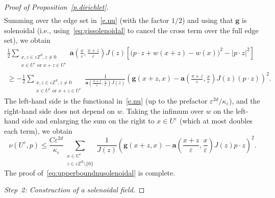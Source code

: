 \documentclass[11pt]{amsart}
\theoremstyle{plain}
\theoremstyle{definition}
\theoremstyle{remark}
\newcommand{\Zd}{\mathbb{Z}^d}
\renewcommand{\a}{\mathbf{a}}
\newcommand{\eps}{\varepsilon}
\begin{document}
\begin{proof}[Proof of Proposition~\ref{p.dirichlet}]
\begin{align*}
		\end{align*}
		Summing over the edge set in~\eqref{e.nu} (with the factor $1/2$) and using that $\mathbf{g}$ is solenoidal (i.e., using~\eqref{eq:gissolenoidal} to cancel the cross term over the full edge set), we obtain
		\begin{multline*}
			\frac{1}{2}\sum_{\substack{x, z \in \eps\Zd, z \ne 0 \\ x \in U^\eps \text{ or } x{+}z \in U^\eps}} \a\left(\frac{x}{\eps}, \frac{x+z}{\eps}\right) J(z) \left[ \bigl(p \cdot z + w(x{+}z) - w(x)\bigr)^2 - |p \cdot z|^2 \right] \\
			\geq - \frac{1}{2}\sum_{\substack{x, z \in \eps\Zd, z \ne 0 \\ x \in U^\eps \text{ or } x{+}z \in U^\eps}} \frac{1}{\a\left(\frac{x+z}{\eps}, \frac{x}{\eps}\right) J(z)} \left( \mathbf{g}(x{+}z, x) - \a\left(\frac{x+z}{\eps}, \frac{x}{\eps}\right) J(z)(p \cdot z) \right)^2.
		\end{multline*}
		The left-hand side is the functional in~\eqref{e.nu} (up to the prefactor $\eps^{2d}/\kappa_\eps$), and the right-hand side does not depend on $w$.
		Taking the infimum over $w$ on the left-hand side and enlarging the sum on the right to $x \in U^\eps$ (which at most doubles each term), we obtain
		\begin{equation*}
			\nu(U^\eps , p)  \leq \frac{C \eps^{2d}}{\kappa_\eps} \sum_{\substack{x \in U^\eps \\ z \in \eps \Zd \setminus \{0\}}}  \frac{1}{J(z)}\left( \mathbf{g}(x + z, x) - \a\left( \frac{x + z}{\eps} , \frac{x}{\eps} \right) J(z) p \cdot z  \right)^2.
		\end{equation*}
		The proof of~\eqref{eq:upperboundnusolenoidal} is complete.
		
		\medskip
		
		\emph{Step~2: Construction of a solenoidal field.}
		
		\medskip
		

\end{proof}
\end{document}
